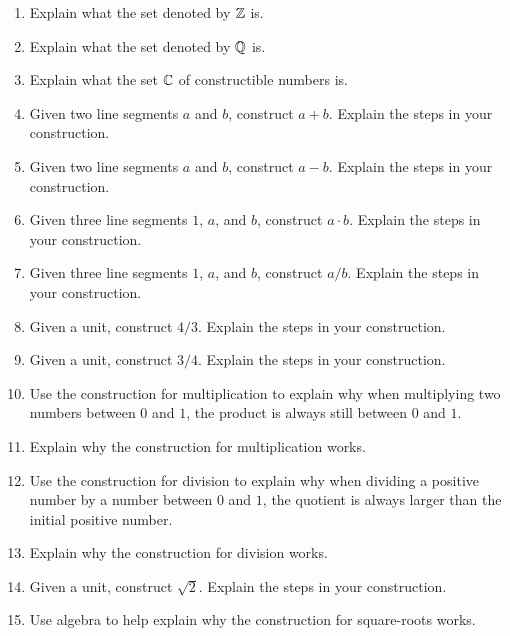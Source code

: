 \begin{problems}
\begin{enumerate}
\item Explain what the set denoted by $\mathbb Z$ is.
\item Explain what the set denoted by $\mathbb Q$ is.
\item Explain what the set $\mathbb C$ of constructible numbers is.
\item Given two line segments $a$ and $b$, construct $a+b$. Explain
  the steps in your construction.
\item Given two line segments $a$ and $b$, construct $a-b$. Explain
  the steps in your construction.
\item Given three line segments $1$, $a$, and $b$, construct $a\cdot
  b$. Explain the steps in your construction.
\item Given three line segments $1$, $a$, and $b$, construct
  $a/b$. Explain the steps in your construction.
\item Given a unit, construct $4/3$. Explain the steps in your
  construction.
\item Given a unit, construct $3/4$. Explain the steps in your
  construction.
\item Use the construction for multiplication to explain why when
  multiplying two numbers between $0$ and $1$, the product is always
  still between $0$ and $1$.
\item Explain why the construction for multiplication works.
\item Use the construction for division to explain why when dividing a
  positive number by a number between $0$ and $1$, the quotient is
  always larger than the initial positive number.
\item Explain why the construction for division works.
\item Given a unit, construct $\sqrt{2}$. Explain the steps in your
  construction.
\item Use algebra to help explain why the construction for
  square-roots works.


\end{enumerate}
\end{problems}
